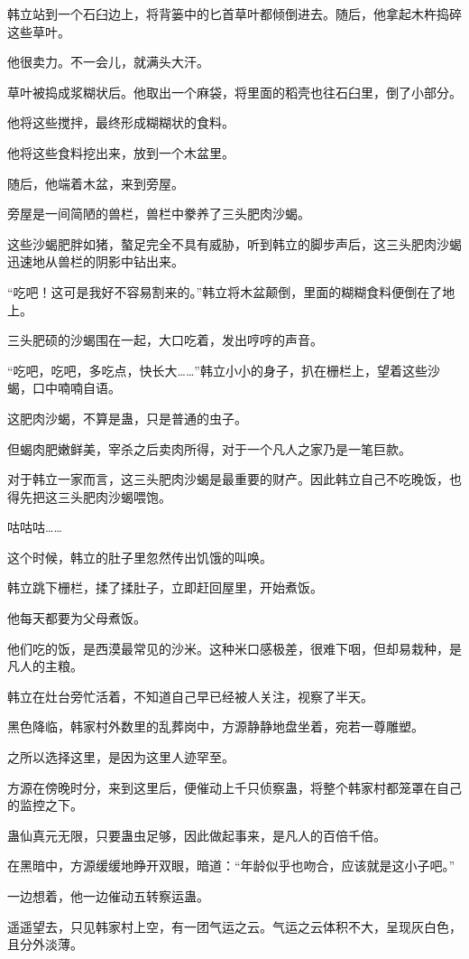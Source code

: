 \begin{this_body}
韩立站到一个石臼边上，将背篓中的匕首草叶都倾倒进去。随后，他拿起木杵捣碎这些草叶。

他很卖力。不一会儿，就满头大汗。

草叶被捣成浆糊状后。他取出一个麻袋，将里面的稻壳也往石臼里，倒了小部分。

他将这些搅拌，最终形成糊糊状的食料。

他将这些食料挖出来，放到一个木盆里。

随后，他端着木盆，来到旁屋。

旁屋是一间简陋的兽栏，兽栏中豢养了三头肥肉沙蝎。

这些沙蝎肥胖如猪，螯足完全不具有威胁，听到韩立的脚步声后，这三头肥肉沙蝎迅速地从兽栏的阴影中钻出来。

“吃吧！这可是我好不容易割来的。”韩立将木盆颠倒，里面的糊糊食料便倒在了地上。

三头肥硕的沙蝎围在一起，大口吃着，发出哼哼的声音。

“吃吧，吃吧，多吃点，快长大……”韩立小小的身子，扒在栅栏上，望着这些沙蝎，口中喃喃自语。

这肥肉沙蝎，不算是蛊，只是普通的虫子。

但蝎肉肥嫩鲜美，宰杀之后卖肉所得，对于一个凡人之家乃是一笔巨款。

对于韩立一家而言，这三头肥肉沙蝎是最重要的财产。因此韩立自己不吃晚饭，也得先把这三头肥肉沙蝎喂饱。

咕咕咕……

这个时候，韩立的肚子里忽然传出饥饿的叫唤。

韩立跳下栅栏，揉了揉肚子，立即赶回屋里，开始煮饭。

他每天都要为父母煮饭。

他们吃的饭，是西漠最常见的沙米。这种米口感极差，很难下咽，但却易栽种，是凡人的主粮。

韩立在灶台旁忙活着，不知道自己早已经被人关注，视察了半天。

黑色降临，韩家村外数里的乱葬岗中，方源静静地盘坐着，宛若一尊雕塑。

之所以选择这里，是因为这里人迹罕至。

方源在傍晚时分，来到这里后，便催动上千只侦察蛊，将整个韩家村都笼罩在自己的监控之下。

蛊仙真元无限，只要蛊虫足够，因此做起事来，是凡人的百倍千倍。

在黑暗中，方源缓缓地睁开双眼，暗道：“年龄似乎也吻合，应该就是这小子吧。”

一边想着，他一边催动五转察运蛊。

遥遥望去，只见韩家村上空，有一团气运之云。气运之云体积不大，呈现灰白色，且分外淡薄。


\end{this_body}
